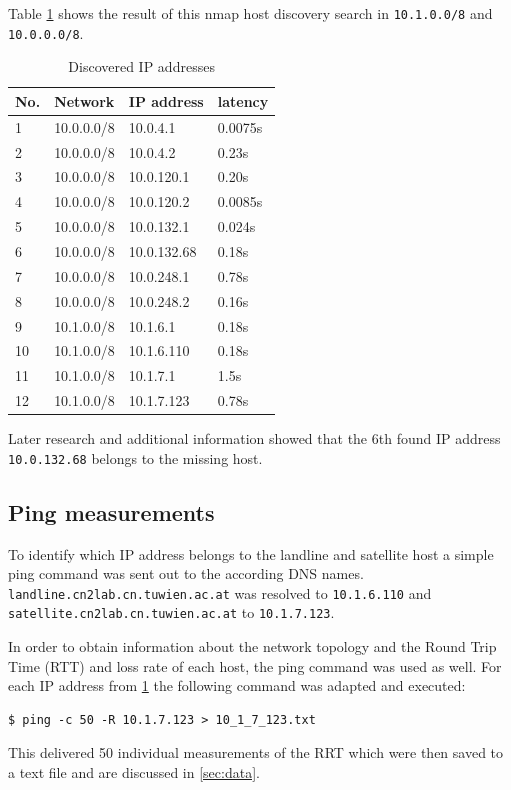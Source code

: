 \documentclass[parskip=full]{scrartcl}
\begin{document}
Table \ref{tab:nmap} shows the result of this nmap host discovery search in \verb|10.1.0.0/8| and \verb|10.0.0.0/8|.

\begin{table}[hb]
	\centering
	\begin{tabular}{|llll|}
		\hline
		\textbf{No.} & \textbf{Network} & \textbf{IP address} &\textbf{latency}  \\ 
		\hline
		1 & 10.0.0.0/8 & 10.0.4.1 &0.0075s\\
		2 & 10.0.0.0/8 & 10.0.4.2 &0.23s\\
		\hline
		3 & 10.0.0.0/8 & 10.0.120.1 &0.20s\\
		4 & 10.0.0.0/8 & 10.0.120.2 &0.0085s\\
		\hline
		5 & 10.0.0.0/8 & 10.0.132.1 &0.024s\\
		6 & 10.0.0.0/8 & 10.0.132.68 &0.18s\\
		\hline
		7 & 10.0.0.0/8 & 10.0.248.1 &0.78s\\
		8 & 10.0.0.0/8 & 10.0.248.2 &0.16s\\
		\hline
		\hline
		9 & 10.1.0.0/8 & 10.1.6.1 &0.18s\\
		10 & 10.1.0.0/8 & 10.1.6.110 &0.18s\\
		\hline
		11 & 10.1.0.0/8 & 10.1.7.1 &1.5s\\
		12 & 10.1.0.0/8 & 10.1.7.123 &0.78s\\
		\hline
	\end{tabular}
	\caption{Discovered IP addresses}
	\label{tab:nmap}
\end{table}

Later research and additional information showed that the 6th found IP address \verb|10.0.132.68| belongs to the missing host. 


\subsection{Ping measurements} \label{subsec:ping}
To identify which IP address belongs to the landline and satellite host a simple ping command was sent out to the according DNS names.
\verb|landline.cn2lab.cn.tuwien.ac.at| was resolved to \verb|10.1.6.110| and \verb|satellite.cn2lab.cn.tuwien.ac.at| to \verb|10.1.7.123|.

In order to obtain information about the network topology and the Round Trip Time (RTT) and loss rate of each host, the ping command was used as well.
For each IP address from \cref{tab:nmap} the following command was adapted and executed:
\begin{verbatim}
$ ping -c 50 -R 10.1.7.123 > 10_1_7_123.txt
\end{verbatim}
This delivered 50 individual measurements of the RRT which were then saved to a text file and are discussed in \cref{sec:data}.
\end{document}

